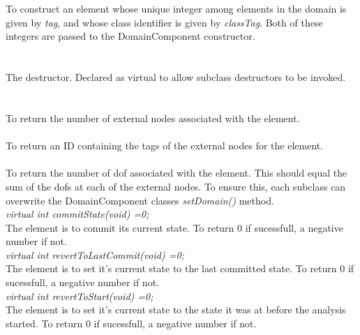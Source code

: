   \\
  \\
To construct an element whose unique integer among elements in the
domain is given by {\em tag}, and whose class identifier is given
by {\em classTag}. Both of these integers are passed to the
DomainComponent constructor. \\

 \\
\\ 
The destructor. Declared as virtual to allow subclass destructors to
be invoked. \\

  \\
 \\
To return the number of external nodes associated with the element. \\

 \\
To return an ID containing the tags of the external nodes for the element. \\

\\
To return the number of dof associated with the element. This should
equal the sum of the dofs at each of the external nodes. To ensure
this, each subclass can overwrite the DomainComponent classes {\em
setDomain()} method.\\ 

{\em virtual int commitState(void) =0;} \\
The element is to commit its current state. To return $0$ if
sucessfull, a negative number if not. \\

{\em virtual int revertToLastCommit(void) =0;} \\
The element is to set it's current state to the last committed
state. To return $0$ if sucessfull, a negative number if not. \\

{\em virtual int revertToStart(void) =0;} \\
The element is to set it's current state to the state it was at before
the analysis started. To return $0$ if sucessfull, a negative number
if not. \\ 

